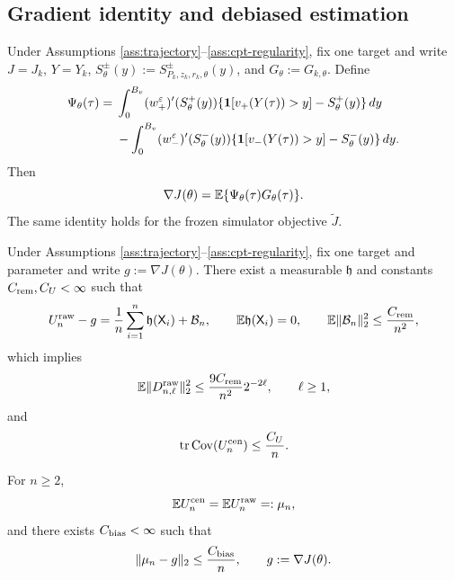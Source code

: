 \subsection{Gradient identity and debiased estimation}

\begin{theorem}\label{thm:gradient-identity}
Under Assumptions \ref{ass:trajectory}--\ref{ass:cpt-regularity}, fix one target and write $J=J_k$, $Y=Y_k$, $S_\theta^\pm(y):=S_{P_k,z_k,r_k,\theta}^\pm(y)$, and $G_\theta:=G_{k,\theta}$.  Define
\begin{align}\label{eq:cpt-multiplier}
 \Psi_\theta(\tau)
 ={}&\int_0^{B_v}(w_+^\varepsilon)'(S_\theta^+(y))
 \{\mathbf 1[v_+(Y(\tau))>y]-S_\theta^+(y)\}\,dy\notag\\
 &-\int_0^{B_v}(w_-^\varepsilon)'(S_\theta^-(y))
 \{\mathbf 1[v_-(Y(\tau))>y]-S_\theta^-(y)\}\,dy.
\end{align}
Then
\begin{equation}\label{eq:score-gradient-identity}
 \nabla J(\theta)=\mathbb E\{\Psi_\theta(\tau)G_\theta(\tau)\}.
\end{equation}
The same identity holds for the frozen simulator objective $\widetilde J$.
\end{theorem}

\begin{lemma}\label{lem:level-cancellation}
Under Assumptions \ref{ass:trajectory}--\ref{ass:cpt-regularity}, fix one target and parameter and write $g:=\nabla J(\theta)$.  There exist a measurable $\mathfrak h$ and constants $C_{\rm rem},C_U<\infty$ such that
\begin{equation}\label{eq:loo-expansion}
 U_n^{\rm raw}-g
 =\frac1n\sum_{i=1}^{n}\mathfrak h(\mathsf X_i)+\mathcal B_n,
 \qquad
 \mathbb E\mathfrak h(\mathsf X_i)=0,
 \qquad
 \mathbb E\lVert\mathcal B_n\rVert_2^2\le\frac{C_{\rm rem}}{n^2},
\end{equation}
which implies
\begin{equation}\label{eq:level-second-moment}
 \mathbb E\lVert D_{n,\ell}^{\rm raw}\rVert_2^2
 \le\frac{9C_{\rm rem}}{n^2}2^{-2\ell},
 \qquad \ell\ge1,
\end{equation}
and
\begin{equation}\label{eq:centered-loo-variance}
 \operatorname{tr}\operatorname{Cov}(U_n^{\rm cen})\le\frac{C_U}{n}.
\end{equation}
\end{lemma}


\begin{lemma}\label{lem:centering-expectation}
For $n\ge2$,
\begin{equation}\label{eq:centered-raw-mean}
 \mathbb E U_n^{\rm cen}=\mathbb E U_n^{\rm raw}=: \mu_n,
\end{equation}
and there exists $C_{\rm bias}<\infty$ such that
\begin{equation}\label{eq:loo-bias-order}
 \lVert\mu_n-g\rVert_2\le \frac{C_{\rm bias}}{n},
 \qquad g:=\nabla J(\theta).
\end{equation}
\end{lemma}

